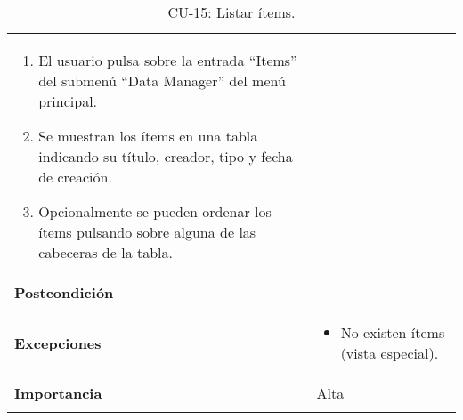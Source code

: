 \begin{longtable}[]{@{}ll@{}}
\begin{minipage}[t]{0.75\columnwidth}
\begin{enumerate}
\def\labelenumi{\arabic{enumi}.}
\tightlist
\item
  El usuario pulsa sobre la entrada ``Items'' del submenú ``Data Manager''
  del menú principal.
\item
  Se muestran los ítems en una tabla indicando su título, creador, tipo
  y fecha de creación.
\item
  Opcionalmente se pueden ordenar los ítems pulsando sobre alguna de las
  cabeceras de la tabla.
\end{enumerate}\strut
\end{minipage}\tabularnewline
\begin{minipage}[t]{0.19\columnwidth}\raggedright
\textbf{Postcondición}\strut
\end{minipage} & \begin{minipage}[t]{0.75\columnwidth}\raggedright
\strut
\end{minipage}\tabularnewline
\begin{minipage}[t]{0.19\columnwidth}\raggedright
\textbf{Excepciones}\strut
\end{minipage} & \begin{minipage}[t]{0.75\columnwidth}\raggedright
\begin{itemize}
\tightlist
\item
  No existen ítems (vista especial).
\end{itemize}\strut
\end{minipage}\tabularnewline
\begin{minipage}[t]{0.19\columnwidth}\raggedright
\textbf{Importancia}\strut
\end{minipage} & \begin{minipage}[t]{0.75\columnwidth}\raggedright
Alta\strut
\end{minipage}\tabularnewline
\bottomrule
\caption{CU-15: Listar ítems.}
\end{longtable}

